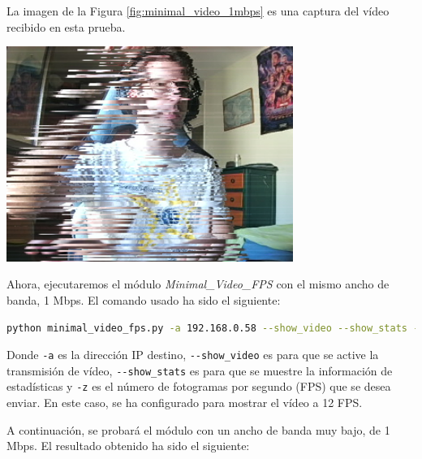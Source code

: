 La imagen de la Figura \ref{fig:minimal_video_1mbps} es una captura del vídeo recibido en esta prueba.
\begin{center}
  \includegraphics[width = 0.7\textwidth]{images/VideoRecibido1.1.png}
  \label{fig:minimal_video_1mbps}
\end{center}

\newpage

\vspace{\baselineskip}

Ahora, ejecutaremos el módulo \textit{Minimal\_Video\_FPS} con el mismo ancho de banda, 1 Mbps. El comando usado ha sido el siguiente:

\begin{lstlisting}[language=bash, basicstyle=\ttfamily\scriptsize]
    python minimal_video_fps.py -a 192.168.0.58 --show_video --show_stats -z 12
\end{lstlisting}

Donde \verb|-a| es la dirección IP destino, \verb|--show_video| es para que se active la transmisión de vídeo, \verb|--show_stats| es para que se muestre la información de estadísticas y \verb|-z| es el número de fotogramas por segundo (FPS) que se desea enviar. En este caso, se ha configurado para mostrar el vídeo a 12 FPS.

A continuación, se probará el módulo con un ancho de banda muy bajo, de 1 Mbps. El resultado obtenido ha sido el siguiente:
\vspace{\baselineskip}

